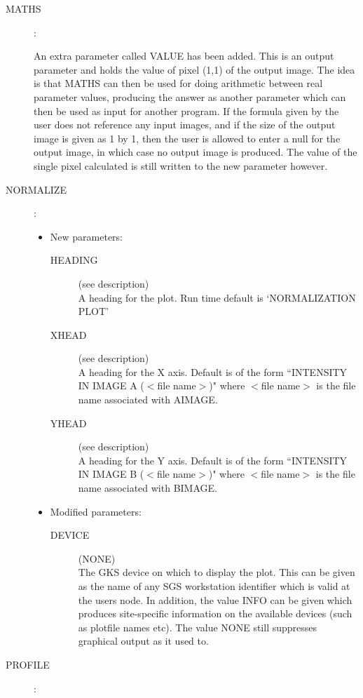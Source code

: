 \begin{description}
\item [MATHS]:

An extra parameter called VALUE has been added.
This is an output parameter and holds the value of pixel (1,1) of the output
image.
The idea is that MATHS can then be used for doing arithmetic between real
parameter values, producing the answer as another parameter which can then be
used as input for another program.
If the formula given by the user does not reference any input images, and if
the size of the output image is given as 1 by 1, then the user is allowed to
enter a null for the output image, in which case no output image is produced.
The value of the single pixel calculated is still written to the new parameter
however.

\item [NORMALIZE]:

\begin{itemize}
\item New parameters:
\begin{description}
\item [HEADING](see description)\\
 A heading for the plot.
 Run time default is `NORMALIZATION PLOT'
\item [XHEAD](see description)\\
 A heading for the X axis.
 Default is of the form ``INTENSITY IN IMAGE A ($<$file name$>$)" where
 $<$file name$>$ is the file name associated with AIMAGE.
\item [YHEAD](see description)\\
 A heading for the Y axis.
 Default is of the form ``INTENSITY IN IMAGE B ($<$file name$>$)" where 
 $<$file name$>$ is the file name associated with BIMAGE.
\end{description}
\item Modified parameters:
\begin{description}
\item [DEVICE](NONE)\\
 The GKS device on which to display the plot.
 This can be given as the name of any SGS workstation identifier which is valid
 at the users node.
 In addition, the value INFO can be given which produces site-specific
 information on the available devices (such as plotfile names etc).
 The value NONE still suppresses graphical output as it used to.
\end{description}
\end{itemize}

\item [PROFILE]:


\end{description}
